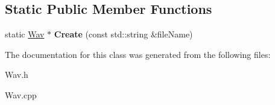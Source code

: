 \subsection*{Static Public Member Functions}
\begin{DoxyCompactItemize}
\item 
\mbox{\label{classWav_a3f742b0d3f1334a9be65ef264711d34f}} 
static \hyperlink{classWav}{Wav} $\ast$ {\bfseries Create} (const std\+::string \&file\+Name)
\end{DoxyCompactItemize}


The documentation for this class was generated from the following files\+:\begin{DoxyCompactItemize}
\item 
Wav.\+h\item 
Wav.\+cpp\end{DoxyCompactItemize}

